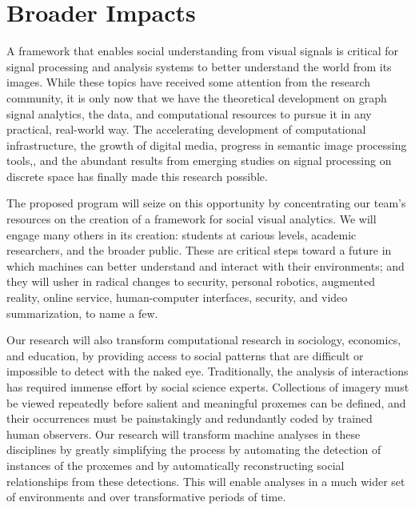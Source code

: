 \vspace{-8pt}
\section{Broader Impacts}
\label{sec:impacts}
\vspace{-8pt}
A framework that enables social understanding from visual signals is critical for signal processing and analysis systems to better understand the world from its images. While these topics have received some attention from the research community, it is only now that we have the theoretical development on graph signal analytics, the data, and computational resources to pursue it in any practical, real-world way. The accelerating development of computational infrastructure, the growth of digital media, progress in semantic image processing tools,, and the abundant results from emerging studies on signal processing on discrete space has finally made this research possible.

The proposed program will seize on this opportunity by concentrating our team's resources on the creation of a framework for social visual analytics. We will engage many others in its creation: students at carious levels, academic researchers, and the broader public. These are critical steps toward a future in which machines can better understand and interact with their environments; and they will usher in radical changes to security, personal robotics, augmented reality, online service, human-computer interfaces, security, and video summarization, to name a few.

Our research will also transform computational research in sociology, economics, and education, by providing access to social patterns that are difficult or impossible to detect with the naked eye. Traditionally, the analysis of interactions has required immense effort by social science experts. Collections of imagery must be viewed repeatedly before salient and meaningful proxemes can be defined, and their occurrences must be painstakingly and redundantly coded by trained human observers. Our research will transform machine analyses in these disciplines by greatly simplifying the process by automating the detection of instances of the proxemes and by automatically reconstructing social relationships from these detections. This will enable analyses in a much wider set of environments and over transformative periods of time.

